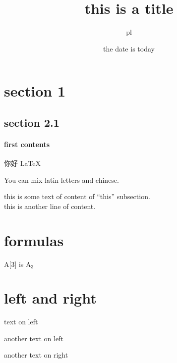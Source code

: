 \documentclass[11pt,a4paper]{book}
\begin{document}
\title{this is a title}
\author{pl}
\date{the date is today}
\maketitle
\tableofcontents



\section{section 1}
\subsection{section 2.1}

\linespread{1.3}
\paragraph{first contents}


\begin{CJK}{UTF8}{gbsn}
  你好 \LaTeX
  
You can mix latin letters and chinese.
\end{CJK}



this is some text of content of ``this'' subsection.\\
this is another line of content.


\section{formulas}{
  \begin{center}
    A[3] is $\mathrm{A}_3$
  \end{center}
}


\section{left and right}{
  \raggedright{text on left}
  \begin{flushleft}
    another text on left
  \end{flushleft}
  \begin{flushright}
    another text on right
  \end{flushright}
}
\end{document}
